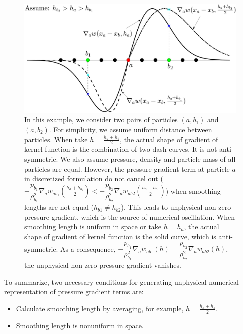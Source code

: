 \documentclass[preprint,12pt,authoryear]{elsarticle}
\begin{document}
\begin{figure}[H]
\centering
\includegraphics[width=0.90 \textwidth ]{App-Figure/dw-ha}
\caption{In this example, we consider two pairs of particles $(a, b_1)$ and $(a, b_2)$. For simplicity, we assume uniform distance between particles. When take $h=\frac{h_a + h_b}{2}$, the actual shape of gradient of kernel function is the combination of two dash curves. It is not anti-symmetric.
We also assume pressure, density and particle mass of all particles are equal. However, the pressure gradient term at particle $a$ in discretized formulation do not cancel out ( $-\dfrac{p_{b_1}}{\rho_{b_1}^2} \nabla_a w_{a b_1}\left(\frac{h_a+h_{b_1}}{2}\right) < -\dfrac{p_{b_2}}{\rho_{b_2}^2} \nabla_a w_{a b2}\left(\frac{h_a+h_{b_1}}{2}\right)$) when smoothing lengths are not equal ($h_{b1} \neq h_{b2}$). This leads to unphysical non-zero pressure gradient, which is the source of numerical oscillation. When smoothing length is uniform in space or take $h = h_a$, the actual shape of gradient of kernel function is the solid curve, which is anti-symmetric. As a consequence, $-\dfrac{p_{b_1}}{\rho_{b_1}^2} \nabla_a w_{a b_1}\left(h\right) = \dfrac{p_{b_2}}{\rho_{b_2}^2} \nabla_a w_{a b2}\left(h\right)$, the unphysical non-zero pressure gradient vanishes.}    
\label{fig:dw-ha}
\end{figure}

To summarize, two necessary conditions for generating unphysical numerical representation of pressure gradient terms are:
\begin{itemize}
\item Calculate smoothing length by averaging, for example, $h = \frac{h_a + h_b}{2}$.
\item Smoothing length is nonuniform in space.
\end{itemize} 
\end{document}
